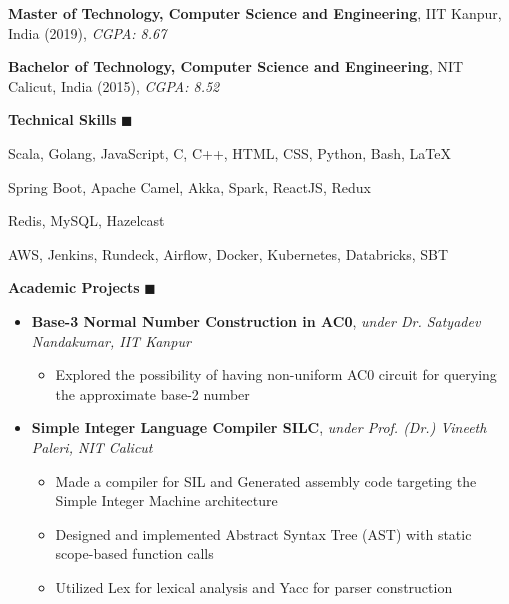 \documentclass[9pt]{extletter}
\begin{document}
\textbf{Master of Technology, Computer Science and Engineering}, IIT Kanpur, India (2019), \textsl{CGPA: 8.67}

\vspace{-5pt}
\textbf{Bachelor of Technology, Computer Science and Engineering}, NIT Calicut, India (2015), \textsl{CGPA: 8.52}

\vspace{9pt}
\textbf{\Large Technical Skills} \hrulefill $\blacksquare$
\vspace{-4pt}
\begin{description}
    \itemsep2pt
    \item[Languages] Scala, Golang, JavaScript, C, C++, HTML, CSS, Python, Bash, \LaTeX
    \item[Frameworks/Libraries] Spring Boot, Apache Camel, Akka, Spark, ReactJS, Redux
    \item[Databases/Caches] Redis, MySQL, Hazelcast
    \item[Cloud/Tools] AWS, Jenkins, Rundeck, Airflow, Docker, Kubernetes, Databricks, SBT
\end{description}
\vspace{-\parskip}
\vspace{9pt}
\textbf{\Large Academic Projects} \hrulefill $\blacksquare$
\vspace{-5pt}
\begin{itemize}
    \item \textbf{Base-3 Normal Number Construction in AC0}, \textsl{under Dr. Satyadev Nandakumar, IIT Kanpur}
    \begin{itemize}
        \itemsep2pt
        \item Explored the possibility of having non-uniform AC0 circuit for querying the approximate base-2 number
    \end{itemize}
    \item \textbf{Simple Integer Language Compiler SILC}, \textsl{under Prof. (Dr.) Vineeth Paleri, NIT Calicut}
    \begin{itemize}
        \itemsep2pt
        \item Made a compiler for SIL and Generated assembly code targeting the Simple Integer Machine architecture
        \item Designed and implemented Abstract Syntax Tree (AST) with static scope-based function calls
        \item Utilized Lex for lexical analysis and Yacc for parser construction
    \end{itemize}
\end{itemize}
\vspace{-\parskip}
\end{document}
